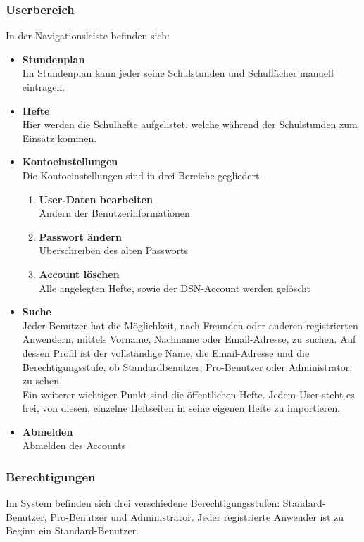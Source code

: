 \subsubsection{Userbereich}


In der Navigationsleiste befinden sich:
\begin{itemize}
\item \textbf{Stundenplan}\\ Im Stundenplan kann jeder seine Schulstunden und Schulfächer manuell eintragen.
\item \textbf{Hefte}\\ Hier werden die Schulhefte aufgelistet, welche während der Schulstunden zum Einsatz kommen.
\item \textbf{Kontoeinstellungen}\\ Die Kontoeinstellungen sind in drei Bereiche gegliedert.
\begin{enumerate}
\item \textbf{User-Daten bearbeiten}\\ Ändern der Benutzerinformationen
\item \textbf{Passwort ändern}\\ Überschreiben des alten Passworts
\item \textbf{Account löschen}\\ Alle angelegten Hefte, sowie der DSN-Account werden gelöscht
\end{enumerate}
\item \textbf{Suche}\\ Jeder Benutzer hat die Möglichkeit, nach Freunden oder anderen registrierten Anwendern, mittels Vorname, Nachname oder Email-Adresse, zu suchen. Auf dessen Profil ist der vollständige Name, die Email-Adresse und die Berechtigungsstufe, ob Standardbenutzer, Pro-Benutzer oder Administrator, zu sehen.\\
Ein weiterer wichtiger Punkt sind die öffentlichen Hefte. Jedem User steht es frei, von diesen, einzelne Heftseiten in seine eigenen Hefte zu importieren.
\item \textbf{Abmelden}\\ Abmelden des Accounts
\end{itemize}
\newpage 

\subsubsection{Berechtigungen}
Im System befinden sich drei verschiedene Berechtigungsstufen: Standard-Benutzer, Pro-Benutzer und Administrator. Jeder registrierte Anwender ist zu Beginn ein Standard-Benutzer.

